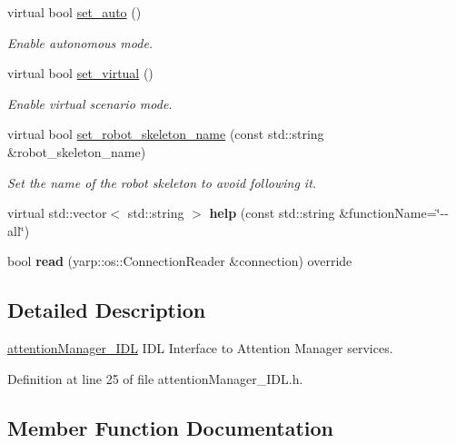 \begin{DoxyCompactItemize}
virtual bool \hyperlink{classattentionManager__IDL_a3c0c61fdb996d2b7378c02e6225a6c20}{set\+\_\+auto} ()
\begin{DoxyCompactList}\small\item\em Enable autonomous mode. \end{DoxyCompactList}\item 
virtual bool \hyperlink{classattentionManager__IDL_a9278a1d0df7c7b1c3b0aa46ef78f8009}{set\+\_\+virtual} ()
\begin{DoxyCompactList}\small\item\em Enable virtual scenario mode. \end{DoxyCompactList}\item 
virtual bool \hyperlink{classattentionManager__IDL_ae50c946fce68f55cac50fe5136e1bc02}{set\+\_\+robot\+\_\+skeleton\+\_\+name} (const std\+::string \&robot\+\_\+skeleton\+\_\+name)
\begin{DoxyCompactList}\small\item\em Set the name of the robot skeleton to avoid following it. \end{DoxyCompactList}\item 
\mbox{\label{classattentionManager__IDL_ac3c162b2616ec83ecb6f605d79c7b6af}} 
virtual std\+::vector$<$ std\+::string $>$ {\bfseries help} (const std\+::string \&function\+Name=\char`\"{}-\/-\/all\char`\"{})
\item 
\mbox{\label{classattentionManager__IDL_ab7ca0482a77f24b49fa05448fb32ba54}} 
bool {\bfseries read} (yarp\+::os\+::\+Connection\+Reader \&connection) override
\end{DoxyCompactItemize}


\subsection{Detailed Description}
\hyperlink{classattentionManager__IDL}{attention\+Manager\+\_\+\+I\+DL} I\+DL Interface to Attention Manager services. 

Definition at line 25 of file attention\+Manager\+\_\+\+I\+D\+L.\+h.



\subsection{Member Function Documentation}
\mbox{\label{classattentionManager__IDL_ad0b7882cea4dd8b0269cd3eaf0f5dbae}} 
